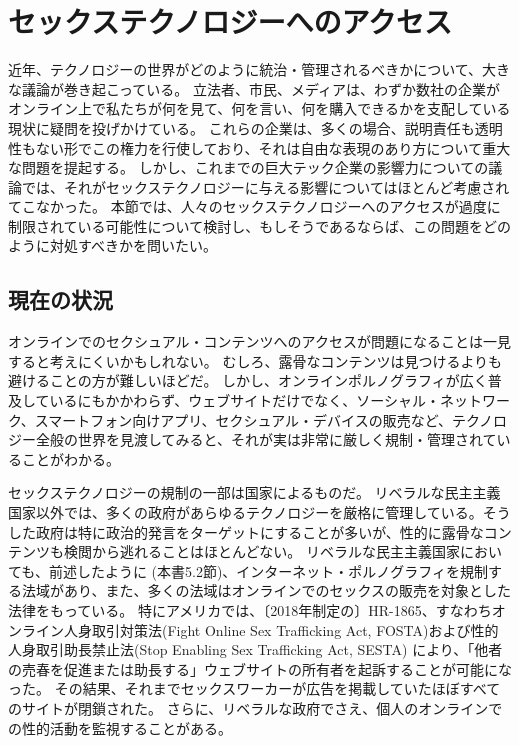 \documentclass[paper=a4,book,openany]{jlreq}
\begin{document}
\section{セックステクノロジーへのアクセス}

近年、テクノロジーの世界がどのように統治・管理されるべきかについて、大きな議論が巻き起こっている。
立法者、市民、メディアは、わずか数社の企業がオンライン上で私たちが何を見て、何を言い、何を購入できるかを支配している現状に疑問を投げかけている。
これらの企業は、多くの場合、説明責任も透明性もない形でこの権力を行使しており、それは自由な表現のあり方について重大な問題を提起する。
しかし、これまでの巨大テック企業の影響力についての議論では、それがセックステクノロジーに与える影響についてはほとんど考慮されてこなかった。
本節では、人々のセックステクノロジーへのアクセスが過度に制限されている可能性について検討し、もしそうであるならば、この問題をどのように対処すべきかを問いたい。

\subsection{現在の状況}

オンラインでのセクシュアル・コンテンツへのアクセスが問題になることは一見すると考えにくいかもしれない。
むしろ、露骨なコンテンツは見つけるよりも避けることの方が難しいほどだ。
しかし、オンラインポルノグラフィが広く普及しているにもかかわらず、ウェブサイトだけでなく、ソーシャル・ネットワーク、スマートフォン向けアプリ、セクシュアル・デバイスの販売など、テクノロジー全般の世界を見渡してみると、それが実は非常に厳しく規制・管理されていることがわかる。

セックステクノロジーの規制の一部は国家によるものだ。
リベラルな民主主義国家以外では、多くの政府があらゆるテクノロジーを厳格に管理している。そうした政府は特に政治的発言をターゲットにすることが多いが、性的に露骨なコンテンツも検閲から逃れることはほとんどない。
リベラルな民主主義国家においても、前述したように (本書5.2節)、インターネット・ポルノグラフィを規制する法域があり、また、多くの法域はオンラインでのセックスの販売を対象とした法律をもっている。
特にアメリカでは、〔2018年制定の〕HR-1865、すなわちオンライン人身取引対策法(Fight Online Sex Trafficking Act, FOSTA)および性的人身取引助長禁止法(Stop Enabling Sex Trafficking Act, SESTA) により、「他者の売春を促進または助長する」ウェブサイトの所有者を起訴することが可能になった。
その結果、それまでセックスワーカーが広告を掲載していたほぼすべてのサイトが閉鎖された\citep{witt18:_after_closur_backp_increas_vulner}。
さらに、リベラルな政府でさえ、個人のオンラインでの性的活動を監視することがある\citep{owen13:_nsa_spied_porn_habit_target_radic}。
\end{document}
